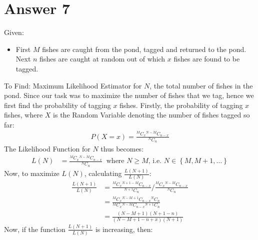 \documentclass[a4paper]{article}
\newcommand*{\Comb}[2]{{}^{#1}C_{#2}}%
\begin{document}
\section{Answer 7}
 Given:
 \begin{itemize}
	 \item {First $M$ fishes are caught from the pond, tagged and returned to the pond. Next $n$ fishes are caught at random out of which $x$ fishes are found to be tagged.}
 \end{itemize}
 To Find: Maximum Likelihood Estimator for $N$, the total number of fishes in the pond.
 \newline\newline
 Since our task was to maximize the number of fishes that we tag, hence we first find the probability of tagging $x$ fishes.
 \newline\newline
 Firstly, the probability of tagging $x$ fishes, where $X$ is the Random Variable denoting the number of fishes tagged so far:
 \begin{equation*}
	\begin{split}
		P\left( X =x \right) = \frac{\Comb{M}{x} \Comb{N-M}{n-x}}{\Comb{N}{n}}
	\end{split}
\end{equation*}
The Likelihood Function for $N$ thus becomes:
 \begin{equation*}
	\begin{split}
		L\left( N \right) &= \frac{\Comb{M}{x} \Comb{N-M}{n-x}}{\Comb{N}{n}} \;\;\text{where $N \ge  M$, i.e. $N \in \left\{ M,M+1,\dots \right\} $}
	\end{split}
\end{equation*}
Now, to maximize $L\left( N \right)$, calculating $\frac{L\left( N+1 \right) }{L\left( N \right) }$:
\begin{equation*}
	\begin{split}
		\frac{L\left( N+1 \right) }{L\left( N \right) } &= \frac{\Comb{M}{x} \Comb{N+1-M}{n-x}}{\Comb{N+1}{n}} / \frac{\Comb{M}{x} \Comb{N-M}{n-x}}{\Comb{N}{n}}\\
		&= \frac{\Comb{M}{x} \Comb{N-M+1}{n-x} \Comb{N}{n} }{\Comb{M}{x} \Comb{N-M}{n-x} \Comb{N+1}{n}}\\
		&= \frac{\left( N-M+1 \right)  \left( N+1-n \right) }{\left( N-M+1-n+x \right) \left( N+1 \right) }
	\end{split}
\end{equation*}
Now, if the function $\frac{L\left( N+1 \right) }{L\left( N \right) }$ is increasing, then:
\end{document}
